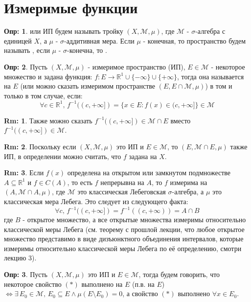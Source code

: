\documentclass[12pt]{article}
\newcommand{\MR}{\mathbb{R}}
\newcommand{\MM}{\mathcal{M}}
\theoremstyle{definition}
\newtheorem{defn}{Опр:}
\newtheorem{rem}{Rm:}
\begin{document}
\section*{Измеримые функции}

\begin{defn}
	 или ИП будем называть тройку $(X,\MM, \mu)$, где $\MM$ - $\sigma$-алгебра с единицей $X$, а $\mu$ - $\sigma$-аддитивная мера. Если $\mu$ - конечная, то пространство будем называть , если $\mu$ - $\sigma$-конечна, то .
\end{defn}

\begin{defn}
	Пусть $(X,\MM, \mu)$ - измеримое пространство (ИП), $E \in \MM$ - некоторое множество и задана функция: $f \colon E \to \MR^1 \cup \{-\infty\} \cup \{+\infty\}$, тогда она называется  на $E$ (или можно сказать измеримом пространстве $(E, E \cap \MM, \mu)$) в том и только в том случае, если:
	$$
		\forall c \in \MR^1, \, f^{-1}((c,+\infty]) = \{x \in E \colon f(x) \in (c, + \infty]\} \in \MM 
	$$
\end{defn}
\begin{rem}
	Также можно сказать $f^{-1}((c,+\infty]) \in \MM \cap E$ вместо $f^{-1}((c,+\infty]) \in \MM$.
\end{rem}
\begin{rem}
	Поскольку если $(X,\MM,\mu)$ это ИП и $E \in \MM$, то $(E, \MM \cap E, \mu)$ также ИП, в определении можно считать, что $f$ задана на $X$.
\end{rem}
\begin{rem}
	Если $f(x)$ определена на открытом или замкнутом подмножестве $A \subseteq \MR^1$ и $f \in C(A)$, то есть $f$ непрерывна на $A$, то $f$ измерима на $(A, \MM \cap A, \mu)$, где $\MM$ это классическая Лебеговская $\sigma$-алгебра, а $\mu$ это классическая мера Лебега. Это следует из следующего факта:
	$$
		\forall c, \, f^{-1}((c,+\infty]) = f^{-1}((c,+ \infty)) = A \cap B
	$$
	где $B$ - открытое множество, а все открытые множества измеримы относительно классической меры Лебега (см. теорему с прошлой лекции, что любое открытое множество представимо в виде дизъюнктного объединения интервалов, которые измеримы относительно классической меры Лебега по её определению, смотри лекцию $3$).
\end{rem}

\begin{defn}
	Пусть $(X, \MM, \mu)$ это ИП и $E \in \MM$, тогда будем говорить, что некоторое свойство $(*)$ выполнено  на $E$ (п.в. на $E$) $\Leftrightarrow \exists \, E_0 \in \MM, \, E_0\subseteq E \wedge \mu(E \setminus E_0) = 0$, а свойство $(*)$ выполнено $\forall x\in E_0$.
\end{defn}
\end{document}
